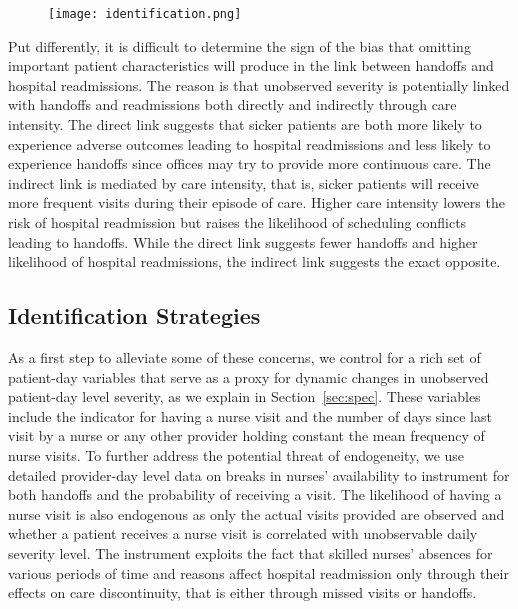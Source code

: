 \documentclass[final,12pt, notitlepage]{article}
\begin{document}
\graphicspath{ {/Users/kimk13/Dropbox/Wharton/Research/Labor/gph/anhandoff/} }
\begin{figure}[H]
\centering
\texttt{[image: identification.png]}
\footnotesize
\label{fig:identification}
\end{figure}
Put differently, it is difficult to determine the sign of the bias that omitting important patient characteristics will produce in the link between handoffs and hospital readmissions. The reason is that unobserved severity is potentially linked with handoffs and readmissions both directly and indirectly through care intensity. The direct link suggests that sicker patients are both more likely to experience adverse outcomes leading to hospital readmissions and less likely to experience handoffs since offices may try to provide more continuous care.
The indirect link is mediated by care intensity, that is, sicker patients will receive more frequent visits during their episode of care. Higher care intensity lowers the risk of hospital readmission but raises the likelihood of scheduling conflicts leading to handoffs. While the direct link suggests fewer handoffs and higher likelihood of hospital readmissions, the indirect link suggests the exact opposite.

\subsection{Identification Strategies} \label{sec:id_strategies}
As a first step to alleviate some of these concerns, we control for a rich set of patient-day variables that serve as a proxy for dynamic changes in unobserved patient-day level severity, as we explain in Section~\ref{sec:spec}.
These variables include the indicator for having a nurse visit and the number of days since last visit by a nurse or any other provider holding constant the mean frequency of nurse visits.
To further address the potential threat of endogeneity, we use detailed provider-day level data on breaks in nurses' availability to instrument for both handoffs and the probability of receiving a visit. The likelihood of having a nurse visit is also endogenous as only the actual visits provided are observed and whether a patient receives a nurse visit is correlated with unobservable daily severity level.
The instrument exploits the fact that skilled nurses' absences for various periods of time and reasons affect hospital readmission only through their effects on care discontinuity, that is either through missed visits or handoffs.
\end{document}
